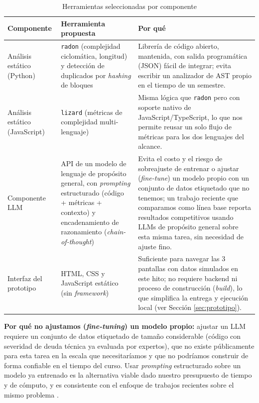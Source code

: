 \begin{table}[H]
\centering
\caption{Herramientas seleccionadas por componente}
\label{tab:herramientas}
\begin{tabular}{p{} p{} p{}}
\toprule
\textbf{Componente} & \textbf{Herramienta propuesta} & \textbf{Por qué} \\
\midrule
Análisis estático (Python) & \texttt{radon} (complejidad ciclomática, longitud) y detección de duplicados por \textit{hashing} de bloques & Librería de código abierto, mantenida, con salida programática (JSON) fácil de integrar; evita escribir un analizador de AST propio en el tiempo de un semestre. \\[4pt]
Análisis estático (JavaScript) & \texttt{lizard} (métricas de complejidad multi-lenguaje) & Misma lógica que \texttt{radon} pero con soporte nativo de JavaScript/TypeScript, lo que nos permite reusar un solo flujo de métricas para los dos lenguajes del alcance. \\[4pt]
Componente LLM & API de un modelo de lenguaje de propósito general, con \textit{prompting} estructurado (código + métricas + contexto) y encadenamiento de razonamiento (\textit{chain-of-thought}) \parencite{Wei2022} & Evita el costo y el riesgo de sobreajuste de entrenar o ajustar (\textit{fine-tune}) un modelo propio con un conjunto de datos etiquetado que no tenemos; un trabajo reciente que comparamos como línea base \parencite{Souza2026} reporta resultados competitivos usando LLMs de propósito general sobre esta misma tarea, sin necesidad de ajuste fino. \\[4pt]
Interfaz del prototipo & HTML, CSS y JavaScript estático (sin \textit{framework}) & Suficiente para navegar las 3 pantallas con datos simulados en este hito; no requiere backend ni proceso de construcción (\textit{build}), lo que simplifica la entrega y ejecución local (ver Sección \ref{sec:prototipo}). \\
\bottomrule
\end{tabular}
\end{table}

\textbf{Por qué no ajustamos (\textit{fine-tuning}) un modelo propio:} ajustar un LLM requiere un conjunto de datos etiquetado de tamaño considerable (código con severidad de deuda técnica ya evaluada por expertos), que no existe públicamente para esta tarea en la escala que necesitaríamos y que no podríamos construir de forma confiable en el tiempo del curso. Usar \textit{prompting} estructurado sobre un modelo ya entrenado es la alternativa viable dado nuestro presupuesto de tiempo y de cómputo, y es consistente con el enfoque de trabajos recientes sobre el mismo problema \parencite{Souza2026}.

